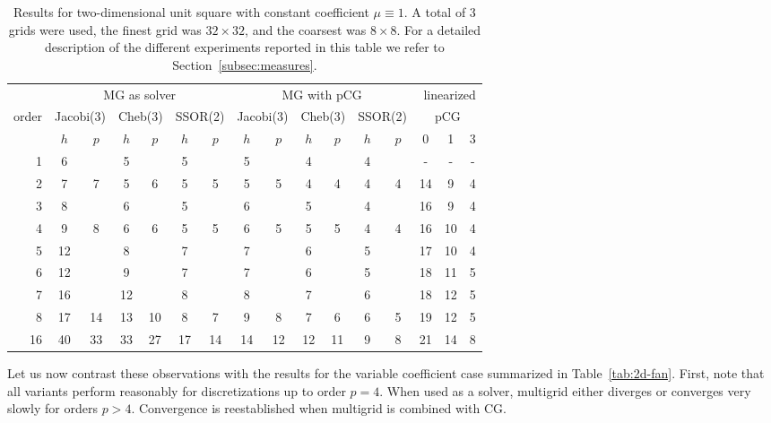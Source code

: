 \documentclass[smallcondensed,final]{svjour3}     %
\newcommand{\gsnote}[1]{\textcolor{blue}{GS: #1}}
\begin{document}

\begin{table}
  \caption{\label{tab:box} Results for two-dimensional unit square
    with constant coefficient $\mu\equiv 1$.  A total of 3 grids were
    used, the finest grid was $32\times 32$, and the coarsest was
    $8\times 8$. For a detailed description of the different
    experiments reported in this table we refer to
    Section~\ref{subsec:measures}.}  \centering
  \begin{tabular}{|r|c c|c c|c c||c c|c c|c c||c c c|} 
    \hline
    & \multicolumn{6}{c||}{MG as solver} & \multicolumn{6}{c||}{MG with pCG} & \multicolumn{3}{r|}{linearized} \\
    \cline{2-13}
    \!\!\! order \!\!\!\! &  \multicolumn{2}{c|}{\!\scriptsize  Jacobi(3)\!} &  \multicolumn{2}{c|}{\!\scriptsize Cheb(3)\!} & \multicolumn{2}{c||}{\!\scriptsize  SSOR(2)\!} & \multicolumn{2}{c|}{\!\scriptsize Jacobi(3)\!} &  \multicolumn{2}{c|}{\!\scriptsize Cheb(3)\!} & \multicolumn{2}{c||}{\!\scriptsize SSOR(2)\!} & \multicolumn{3}{c|}{pCG}\\
\hline
 & $h$ & $p$ & $h$ & $p$& $h$ & $p$& $h$ & $p$& $h$ & $p$& $h$ & $p$& 0 & 1 & 3\\
 \cline{2-16}
1 & 6 & & 5 & & 5 & & 5 & & 4 & & 4 & & - & - & - \\
2 & 7 & 7 & 5 & 6 & 5 & 5 & 5 & 5 & 4 & 4 & 4 & 4 & 14 & 9 & 4 \\
3 & 8 & & 6 & & 5 & & 6 & & 5 & & 4 & & 16 & 9 & 4 \\
4 & 9 & 8 & 6 & 6 & 5 & 5 & 6 & 5 & 5 & 5 & 4 & 4 & 16 & 10 & 4 \\
5 & 12 & & 8 & & 7 & & 7 & & 6 & & 5 & & 17 & 10 & 4 \\
6 & 12 & & 9 & & 7 & & 7 & & 6 & & 5 & & 18 & 11 & 5\\
7 & 16 & & 12 & & 8 & & 8 & & 7 & & 6 & & 18 & 12 & 5 \\
8 & 17 & 14 & 13 & 10 & 8 & 7 & 9 & 8 & 7 & 6 & 6 & 5 & 19 & 12 & 5\\
16 & 40 & 33 & 33 & 27 & 17 & 14 & 14 & 12 & 12 & 11 & 9 & 8 & 21 & 14 & 8 \\
\hline
  \end{tabular}
\end{table}


Let us now contrast these observations with the results for the
variable coefficient case summarized in Table~\ref{tab:2d-fan}. First,
note that all variants perform reasonably for discretizations up to
order $p=4$. When used as a solver, multigrid either diverges or
converges very slowly for orders $p>4$. Convergence is reestablished
when multigrid is combined with CG.
\end{document}
